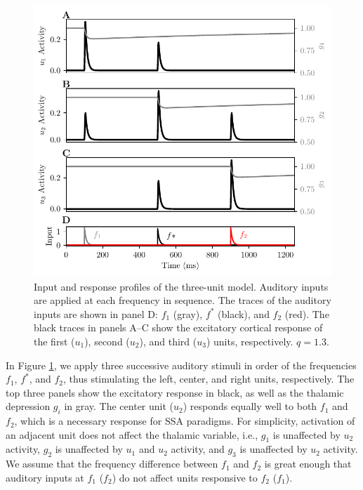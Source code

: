 \documentclass[a4paper,10pt]{article}
\begin{document}
\begin{figure}[ht!]
\centering
\includegraphics[width=.75\textwidth]{rate_responses3.pdf}
 \caption{Input and response profiles of the three-unit model. Auditory inputs are applied at each frequency in sequence. The traces of the auditory inputs are shown in panel D: $f_1$ (gray), $f^*$ (black), and $f_2$ (red). The black traces in panels A--C show the excitatory cortical response of the first ($u_1$), second ($u_2$), and third ($u_3$) units, respectively. $q=1.3$.}\label{fig:3unit}
\end{figure}


In Figure \ref{fig:3unit}, we apply three successive auditory stimuli in order of the frequencies $f_1$, $f^*$, and $f_2$, thus stimulating the left, center, and right units, respectively. The top three panels show the excitatory response in black, as well as the thalamic depression $g_i$ in gray. The center unit ($u_2$) responds equally well to both $f_1$ and $f_2$, which is a necessary response for SSA paradigms. For simplicity, activation of an adjacent unit does not affect the thalamic variable, i.e., $g_1$ is unaffected by $u_2$ activity, $g_2$ is unaffected by $u_1$ and $u_2$ activity, and $g_3$ is unaffected by $u_2$ activity. We assume that the frequency difference between $f_1$ and $f_2$ is great enough that auditory inputs at $f_1$ ($f_2$) do not affect units responsive to $f_2$ ($f_1$).


\end{document}
